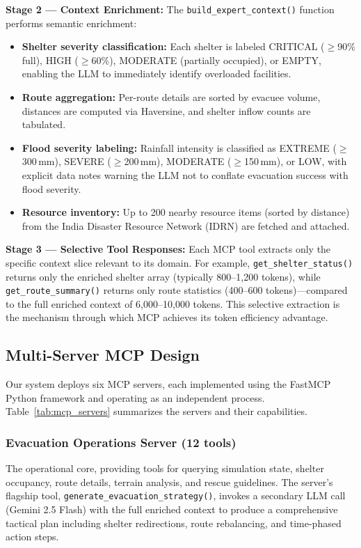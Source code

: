 \documentclass[journal]{IEEEtran}
\begin{document}
\textbf{Stage 2 --- Context Enrichment:}
The \texttt{build\_expert\_context()} function performs semantic enrichment:

\begin{itemize}[leftmargin=*]
    \item \textbf{Shelter severity classification:} Each shelter is labeled
    CRITICAL ($\geq$90\% full), HIGH ($\geq$60\%), MODERATE (partially
    occupied), or EMPTY, enabling the LLM to immediately identify overloaded
    facilities.
    \item \textbf{Route aggregation:} Per-route details are sorted by
    evacuee volume, distances are computed via Haversine, and shelter inflow
    counts are tabulated.
    \item \textbf{Flood severity labeling:} Rainfall intensity is classified
    as EXTREME ($\geq$300\,mm), SEVERE ($\geq$200\,mm), MODERATE
    ($\geq$150\,mm), or LOW, with explicit data notes warning the LLM not
    to conflate evacuation success with flood severity.
    \item \textbf{Resource inventory:} Up to 200 nearby resource items
    (sorted by distance) from the India Disaster Resource Network (IDRN)
    are fetched and attached.
\end{itemize}

\textbf{Stage 3 --- Selective Tool Responses:}
Each MCP tool extracts only the specific context slice relevant to its
domain. For example, \texttt{get\_shelter\_status()} returns only the
enriched shelter array (typically 800--1,200 tokens), while
\texttt{get\_route\_summary()} returns only route statistics
(400--600 tokens)---compared to the full enriched context of
6,000--10,000 tokens. This selective extraction is the mechanism through
which MCP achieves its token efficiency advantage.


\subsection{Multi-Server MCP Design}

Our system deploys six MCP servers, each implemented using the FastMCP
Python framework and operating as an independent process. Table~\ref{tab:mcp_servers}
summarizes the servers and their capabilities.

\subsubsection{Evacuation Operations Server (12 tools)}
The operational core, providing tools for querying simulation state,
shelter occupancy, route details, terrain analysis, and rescue guidelines.
The server's flagship tool, \texttt{generate\_evacuation\_strategy()},
invokes a secondary LLM call (Gemini 2.5 Flash) with the full enriched
context to produce a comprehensive tactical plan including shelter
redirections, route rebalancing, and time-phased action steps.
\end{document}
